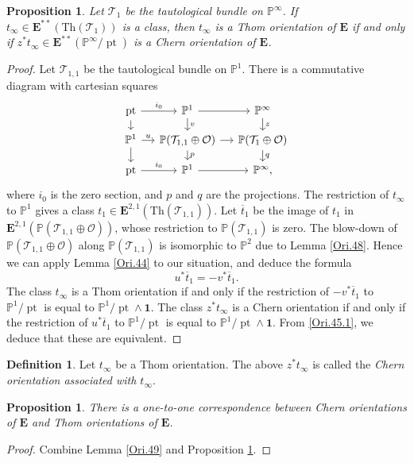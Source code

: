 \documentclass[11pt, a4paper]{amsart}
\newtheorem{prop}[thm]{Proposition}
\theoremstyle{definition}
\newtheorem{df}[thm]{Definition}
\numberwithin{equation}{subsection}
\renewcommand{\P}{\mathbb{P}}
\newcommand{\pt}[1]{\mathrm{\pt}_{#1}}
\newcommand{\Thom}{\mathrm{Th}}
\newcommand{\ol}{\overline}
\newcommand{\cO}{\mathcal{O}}
\newcommand{\cT}{\mathcal{T}}
\def\pt{\operatorname{pt}}
\newcommand{\unit}{\mathbf{1}}
\newcommand{\ringE}{\mathbf{E}}
\begin{document}
\begin{prop}
\label{Ori.45}
Let $\cT_1$ be the tautological bundle on $\P^\infty$.
If $t_\infty\in \ringE^{**}(\Thom(\cT_1))$ is a class, then $t_\infty$ is a Thom orientation of $\ringE$ if and only if $z^*t_\infty\in \ringE^{**}(\P^\infty/\pt)$ is a Chern orientation of $\ringE$.
\end{prop}
\begin{proof}
Let $\cT_{1,1}$ be the tautological bundle on $\P^1$.
There is a commutative diagram with cartesian squares
\[
\begin{tikzcd}[column sep=small, row sep=small]
\pt\ar[d]\ar[r,"i_0"]&
\P^1\ar[d,"v"]\ar[r]&
\P^\infty\ar[d,"z"]
\\
\P^1\ar[d]\ar[r,"u"]&
\P(\cT_{1,1}\oplus \cO)\ar[d,"p"]\ar[r]&
\P(\cT_{1}\oplus \cO)\ar[d,"q"]
\\
\pt\ar[r,"i_0"]&
\P^1\ar[r]&
\P^\infty,
\end{tikzcd}
\]
where $i_0$ is the zero section, and $p$ and $q$ are the projections.
The restriction of $t_\infty$ to $\P^1$ gives a class $t_1\in \ringE^{2,1}(\Thom(\cT_{1,1}))$.
Let $\ol{t}_1$ be the image of $t_1$ in $\ringE^{2,1}(\P(\cT_{1,1}\oplus \cO))$, whose restriction to $\P(\cT_{1,1})$ is zero.
The blow-down of $\P(\cT_{1,1}\oplus \cO)$ along $\P(\cT_{1,1})$ is isomorphic to $\P^2$ due to Lemma \ref{Ori.48}.
Hence we can apply Lemma \ref{Ori.44} to our situation, and deduce the formula
\begin{equation}
\label{Ori.45.1}
u^*\ol{t}_1=-v^*\ol{t}_1.
\end{equation}
The class $t_\infty$ is a Thom orientation if and only if the restriction of $-v^*\ol{t}_1$ to $\P^1/\pt$ is equal to $\P^1/\pt\wedge \unit$.
The class $z^*t_\infty$ is a Chern orientation if and only if the restriction of $u^*\ol{t}_1$ to $\P^1/\pt$ is equal to $\P^1/\pt\wedge \unit$.
From \eqref{Ori.45.1}, we deduce that these are equivalent.
\end{proof}

\begin{df}
Let $t_\infty$ be a Thom orientation.
The above $z^*t_\infty$ is called the \emph{Chern orientation associated with $t_\infty$}.
\end{df}




\begin{prop}
\label{Ori.53}
There is a one-to-one correspondence between Chern orientations of $\ringE$ and Thom orientations of $\ringE$.
\end{prop}
\begin{proof}
Combine Lemma \ref{Ori.49} and Proposition \ref{Ori.45}.
\end{proof}
\end{document}
